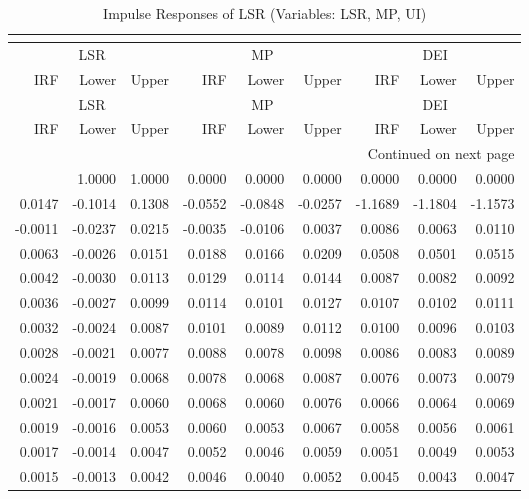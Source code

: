 \begin{longtable}{rrrrrrrrr}
\caption{Impulse Responses of LSR (Variables: LSR, MP, UI)}\\
\label{tab:lsr_irf_group1}\\
\toprule
\multicolumn{3}{c}{LSR} & \multicolumn{3}{c}{MP} & \multicolumn{3}{c}{DEI} \\
IRF & Lower & Upper & IRF & Lower & Upper & IRF & Lower & Upper \\
\midrule
\endfirsthead
\toprule
\multicolumn{3}{c}{LSR} & \multicolumn{3}{c}{MP} & \multicolumn{3}{c}{DEI} \\
IRF & Lower & Upper & IRF & Lower & Upper & IRF & Lower & Upper \\
\midrule
\endhead
\midrule
\multicolumn{9}{r}{Continued on next page} \\
\midrule
\endfoot
\bottomrule
\endlastfoot
1.0000 & 1.0000 & 1.0000 & 0.0000 & 0.0000 & 0.0000 & 0.0000 & 0.0000 & 0.0000 \\
0.0147 & -0.1014 & 0.1308 & -0.0552 & -0.0848 & -0.0257 & -1.1689 & -1.1804 & -1.1573 \\
-0.0011 & -0.0237 & 0.0215 & -0.0035 & -0.0106 & 0.0037 & 0.0086 & 0.0063 & 0.0110 \\
0.0063 & -0.0026 & 0.0151 & 0.0188 & 0.0166 & 0.0209 & 0.0508 & 0.0501 & 0.0515 \\
0.0042 & -0.0030 & 0.0113 & 0.0129 & 0.0114 & 0.0144 & 0.0087 & 0.0082 & 0.0092 \\
0.0036 & -0.0027 & 0.0099 & 0.0114 & 0.0101 & 0.0127 & 0.0107 & 0.0102 & 0.0111 \\
0.0032 & -0.0024 & 0.0087 & 0.0101 & 0.0089 & 0.0112 & 0.0100 & 0.0096 & 0.0103 \\
0.0028 & -0.0021 & 0.0077 & 0.0088 & 0.0078 & 0.0098 & 0.0086 & 0.0083 & 0.0089 \\
0.0024 & -0.0019 & 0.0068 & 0.0078 & 0.0068 & 0.0087 & 0.0076 & 0.0073 & 0.0079 \\
0.0021 & -0.0017 & 0.0060 & 0.0068 & 0.0060 & 0.0076 & 0.0066 & 0.0064 & 0.0069 \\
0.0019 & -0.0016 & 0.0053 & 0.0060 & 0.0053 & 0.0067 & 0.0058 & 0.0056 & 0.0061 \\
0.0017 & -0.0014 & 0.0047 & 0.0052 & 0.0046 & 0.0059 & 0.0051 & 0.0049 & 0.0053 \\
0.0015 & -0.0013 & 0.0042 & 0.0046 & 0.0040 & 0.0052 & 0.0045 & 0.0043 & 0.0047 \\
\end{longtable}